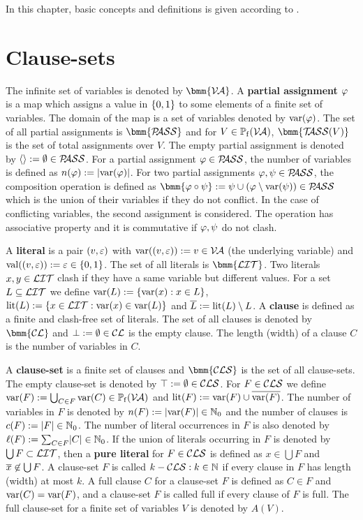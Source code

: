 \documentclass{report}
\begin{document}
In this chapter, basic concepts and definitions is given according to \cite{GwynneKullmann2013GoodRepresentationsIIex, BeyersdorffKullmann2014PHP,KullmannZhao2010Extremal}. 

\section{Clause-sets}
\label{sec:Clause-sets}

The infinite set of variables is denoted by $\bmm{\Va}$. A \textbf{partial assignment} $\varphi$ is a map which assigns a value in $\{ 0,1 \}$ to some elements of a finite set of variables. The domain of the map is a set of variables denoted by $\operatorname{var}(\varphi)$. The set of all partial assignments is $\bmm{\Pass}$ and for $V \in \operatorname{\mathbb{P}_f}(\mathcal{V\hspace{-0.1em}A})$, $\bmm{\Tass(V)}$ is the set of total assignments over $V$. The empty partial assignment is denoted by $\langle  \rangle:= \emptyset \in \mathcal{P\hspace{-0.32em}ASS}$. For a partial assignment $\varphi \in \mathcal{P\hspace{-0.32em}ASS}$, the number of variables is defined as $n(\varphi):=\lvert \operatorname{var}(\varphi) \rvert$. For two partial assignments $\varphi, \psi \in \mathcal{P\hspace{-0.32em}ASS}$, the composition operation is defined as $\bmm{\vp \circ \psi} := \psi \cup (\vp \sm \var(\psi)) \in \Pass$ which is the union of their variables if they do not conflict. In the case of conflicting variables, the second assignment is considered. The operation has associative property and it is commutative if $\varphi, \psi$ do not clash.

A \textbf{literal} is a pair $(v,\varepsilon)$ with $\operatorname{var}((v,\varepsilon)):=v \in \mathcal{V\hspace{-0.1em}A}$ (the underlying variable) and $\operatorname{val}((v,\varepsilon)):=\varepsilon \in \{ 0,1 \}$. The set of all literals is $\bmm{\Lit}$. Two literals $x, y \in \mathcal{LIT}$ clash if they have a same variable but different values. For a set $L \subseteq \mathcal{LIT}$ we define $\operatorname{var}(L) := \{ \operatorname{var}(x) :x \in L \}$, $\operatorname{lit}(L):= \{ x \in \mathcal{LIT} : \operatorname{var}(x) \in \operatorname{var}(L) \}$ and $\overline{L} := \operatorname{lit}(L) \setminus L$. A \textbf{clause} is defined as a finite and clash-free set of literals. The set of all clauses is denoted by $\bmm{\Cl}$ and $\bot := \emptyset \in \mathcal{CL}$ is the empty clause. The length (width) of a clause $C$ is the number of variables in $C$.

A \textbf{clause-set} is a finite set of clauses and $\bmm{\Cls}$ is the set of all clause-sets. The empty clause-set is denoted by $\top := \emptyset \in \mathcal{CLS}$. For $F \in \mathcal{CLS}$ we define $\operatorname{var}(F) := \bigcup_{C \in F} \operatorname{var}(C) \in \operatorname{\mathbb{P}_f}(\mathcal{V\hspace{-0.1em}A})$ and $\operatorname{lit}(F) := \operatorname{var}(F) \cup \overline{\operatorname{var}(F)}$. The number of variables in $F$ is denoted by $n(F) := \lvert \operatorname{var}(F) \rvert \in \mathbb{N}_0$ and the number of clauses is $c(F) := \lvert F \rvert \in \mathbb{N}_0$. The number of literal occurrences in $F$ is also denoted by $\ell(F) := \sum_{C \in F} \lvert C \rvert \in \mathbb{N}_0$. If the union of literals occurring in $F$ is denoted by $\bigcup F \subset \mathcal{LIT}$, then a \textbf{pure literal} for $F \in \mathcal{CLS}$ is defined as $x \in \bigcup F$ and $\overline{x} \not \in \bigcup F$. A clause-set $F$ is called $k-\mathcal{CLS}: k \in \mathbb{N}$ if every clause in $F$ has length (width) at most $k$. A full clause $C$  for a clause-set $F$ is defined as $C \in F$ and $\operatorname{var}(C) = \operatorname{var}(F)$, and a clause-set $F$ is called full if every clause of $F$ is full. The full clause-set for a finite set of variables $V$ is denoted by $A(V)$. 
\end{document}

